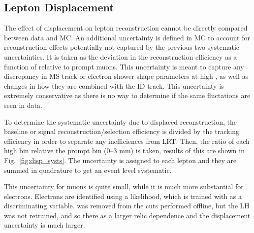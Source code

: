 \subsection{Lepton Displacement}

The effect of displacement on lepton reconstruction cannot be directly compared between data and \ac{MC}. An additional uncertainty is defined in \ac{MC} to account for reconstruction effects potentially not captured by the previous two systematic uncertainties. It is taken as the deviation in the reconstruction efficiency as a function of \absdz relative to prompt muons.
This uncertainty is meant to capture any discrepancy in \ac{MS} track or electron shower shape parameters at high \absdz, as well as changes in how they are combined with the \ac{ID} track. This uncertainty is extremely conservative as there is no way to determine if the same fluctations are seen in data.


To determine the systematic uncertainty due to displaced reconstruction, the baseline or signal reconstruction/selection efficiency is divided by the tracking efficiency in order to separate any inefficiences from \ac{LRT}. Then, the ratio of each high \dz bin relative the prompt bin (0--3 mm) is taken, results of this are shown in Fig.~\ref{fig:disp_systs}. The uncertainty is assigned to each lepton and they are summed in quadrature to get an event level systematic. 


This uncertainty for muons is quite small, while it is much more substantial for electrons. Electrons are identified using a likelihood, which is trained with \dz as a discriminating variable. \absdz was removed from the cuts performed offline, but the LH was not retrained, and so there as a larger relic \dz dependence and the displacement uncertainty is much larger.


